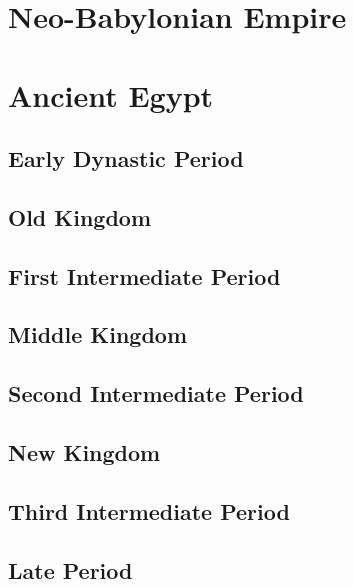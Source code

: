 \documentclass{article}
\begin{document}
\section{Neo-Babylonian Empire}


\section{Ancient Egypt}

  \subsection{Early Dynastic Period}

  \subsection{Old Kingdom}

  \subsection{First Intermediate Period}

  \subsection{Middle Kingdom}

  \subsection{Second Intermediate Period}

  \subsection{New Kingdom}

  \subsection{Third Intermediate Period}

  \subsection{Late Period}
\end{document}
